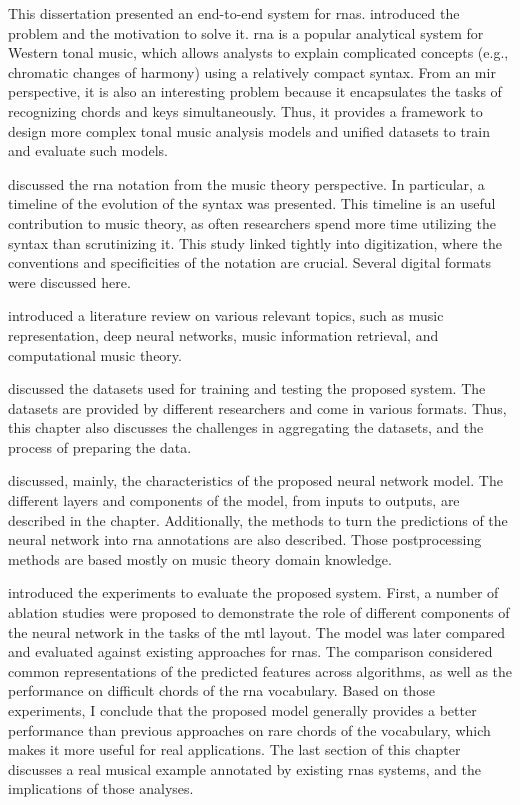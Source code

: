 
This dissertation presented an end-to-end system for
\glspl{rna}.  introduced the problem
and the motivation to solve it. \gls{rna} is a popular
analytical system for Western tonal music, which allows
analysts to explain complicated concepts (e.g., chromatic
changes of harmony) using a relatively compact syntax. From
an \gls{mir} perspective, it is also an interesting problem
because it encapsulates the tasks of recognizing chords and
keys simultaneously. Thus, it provides a framework to design
more complex tonal music analysis models and unified
datasets to train and evaluate such models.

 discussed the
\gls{rna} notation from the music theory perspective. In
particular, a timeline of the evolution of the syntax was
presented. This timeline is an useful contribution to music
theory, as often researchers spend more time utilizing the
syntax than scrutinizing it. This study linked tightly into
digitization, where the conventions and specificities of the
notation are crucial. Several digital formats were discussed
here.

 introduced a literature review on
various relevant topics, such as music representation, deep
neural networks, music information retrieval, and
computational music theory.

 discussed the
datasets used for training and testing the proposed system.
The datasets are provided by different researchers and come
in various formats. Thus, this chapter also discusses the
challenges in aggregating the datasets, and the process of
preparing the data.

 discussed, mainly, the characteristics
of the proposed neural network model. The different layers
and components of the model, from inputs to outputs, are
described in the chapter. Additionally, the methods to turn
the predictions of the neural network into \gls{rna}
annotations are also described. Those postprocessing methods
are based mostly on music theory domain knowledge.

 introduced the experiments
to evaluate the proposed system. First, a number of ablation
studies were proposed to demonstrate the role of different
components of the neural network in the tasks of the
\gls{mtl} layout. The model was later compared and evaluated
against existing approaches for \glspl{rna}. The comparison
considered common representations of the predicted features
across algorithms, as well as the performance on difficult
chords of the \gls{rna} vocabulary. Based on those
experiments, I conclude that the proposed model generally
provides a better performance than previous approaches on
rare chords of the vocabulary, which makes it more useful
for real applications. The last section of this chapter
discusses a real musical example annotated by existing
\glspl{rna} systems, and the implications of those analyses.
